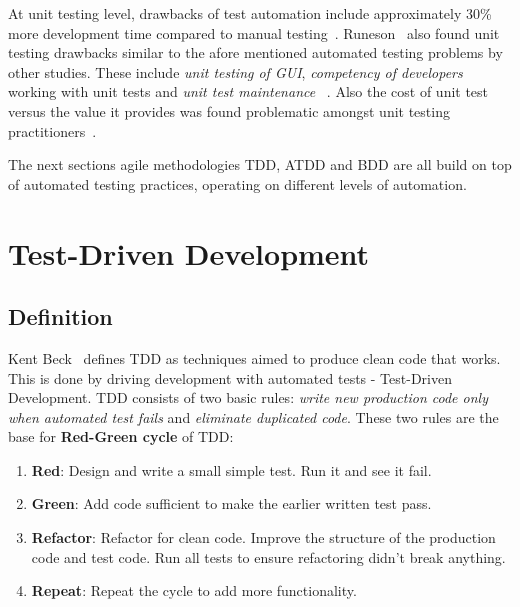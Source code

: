     At unit testing level, drawbacks of test automation include approximately 30\% more development time compared to manual testing~\cite{williams2009effectiveness}.
    Runeson~\cite{runeson2006survey} also found unit testing drawbacks similar to the afore mentioned automated testing problems by other studies.
    These include \textit{unit testing of GUI}, \textit{competency of developers} working with unit tests and \textit{unit test maintenance}~\cite{runeson2006survey} .
    Also the cost of unit test versus the value it provides was found problematic amongst unit testing practitioners~\cite{runeson2006survey}.

    The next sections agile methodologies TDD, ATDD and BDD are all build on top of automated testing practices, operating on different levels
    of automation.

\section{Test-Driven Development} %
    \subsection{Definition}
    Kent Beck~\cite{beck2003test} defines TDD as techniques aimed to produce clean code that works.
    This is done by driving development with automated tests - Test-Driven Development. TDD consists of two basic rules:
    \textit{write new production code only when automated test fails} and
    \textit{eliminate duplicated code}. These two rules are the base for \textbf{Red-Green cycle} of TDD:

    \begin{enumerate}
    \item \textbf{Red}: Design and write a small simple test. Run it and see it fail.
    \item \textbf{Green}: Add code sufficient to make the earlier written test pass.
    \item \textbf{Refactor}: Refactor for clean code. Improve the structure of the production code and test code.
    Run all tests to ensure refactoring didn't break anything.
    \item \textbf{Repeat}: Repeat the cycle to add more functionality.
    \end{enumerate}

